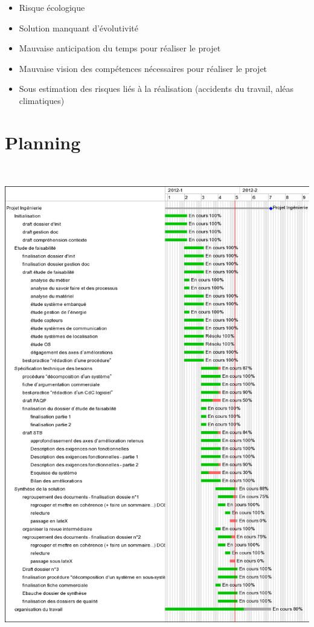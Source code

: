 \documentclass{mise_en_page}
\begin{document}
\begin{itemize}
\item Risque écologique
\item Solution manquant d’évolutivité
\item Mauvaise anticipation du temps pour réaliser le projet
\item Mauvaise vision des compétences nécessaires pour réaliser le
projet
\item Sous estimation des risques liés à la réalisation (accidents du
travail, aléas climatiques)
\end{itemize}
\section{Planning}

\includegraphics[width=14.579cm,height=20.876cm]{Dossierdinitialisationgestion-img1.png}
\end{document}
